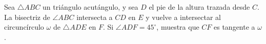 Sea $\bigtriangleup ABC$ un triángulo acutángulo, y sea $D$ el pie de la altura trazada desde $C$. La
bisectriz de $\angle ABC$ intersecta a $CD$ en $E$ y vuelve a intersectar al circuncírculo $\omega$ de $\bigtriangleup ADE$ en $F$. Si
$\angle ADF = 45^{\circ}$, muestra que $CF$ es tangente a $\omega$.
